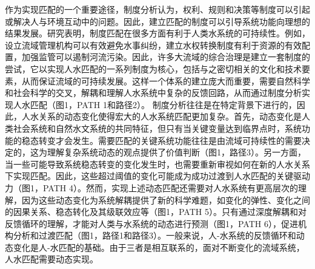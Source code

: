 作为实现匹配的一个重要途径，制度分析认为，权利、规则和决策等制度可以引起或解决人与环境互动中的问题。因此，建立匹配的制度可以引导系统功能向理想的结果发展。研究表明，制度匹配在很多方面有利于人类水系统的可持续性。例如，设立流域管理机构可以有效避免水事纠纷，建立水权转换制度有利于资源的有效配置，加强监管可以遏制河流污染。因此，许多大流域的综合治理是建立一套制度的尝试，它以实现人水匹配的一系列制度为核心，包括与之密切相关的文化和技术要素，从而保证流域的可持续发展。这样一个体系的建立庞大而重要，需要自然科学和社会科学的交叉，解耦和理解人水系统中复杂的反馈回路，从而通过制度分析实现人水匹配（图1，PATH 1和路径2）。
制度分析往往是在特定背景下进行的，因此，人水关系的动态变化使得宏大的人水系统匹配更加复杂。首先，动态变化是人类社会系统和自然水文系统的共同特征，但只有当关键变量达到临界点时，系统功能的稳态转变才会发生。需要匹配的关键系统功能往往是由流域可持续性的需要决定的，这为理解复杂系统动态的观点提供了价值判断（图1，路径3）。另一方面，当一些可能导致系统稳态转变的变化发生时，也需要重新审视如何在新的人水关系下实现匹配。因此，这些超过阈值的变化可能成为成功过渡到人水匹配的关键驱动力（图1，PATH 4）。然而，实现上述动态匹配还需要对人水系统有更高层次的理解，因为这些动态变化为系统解耦提供了新的科学难题，如变化的弹性、变化之间的因果关系、稳态转化及其级联效应等（图1，PATH 5）。只有通过深度解耦和对反馈循环的理解，才能对人类与水系统的动态进行预测（图1，PATH 6），促进机构分析和过渡匹配（图1，路径1和路径3）。一般来说，人-水系统的反馈循环和动态变化是人-水匹配的基础。由于三者是相互联系的，面对不断变化的流域系统，人水匹配需要动态实现。
